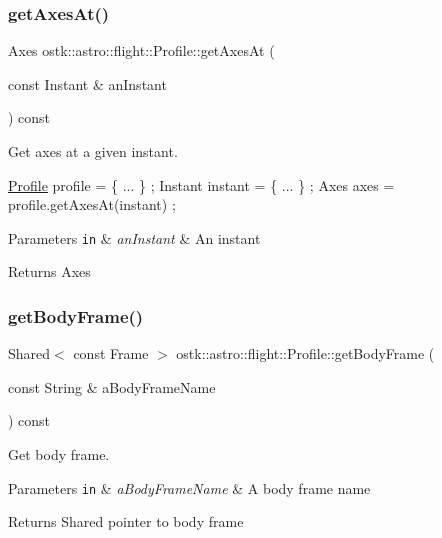 \subsubsection{\texorpdfstring{get\+Axes\+At()}{getAxesAt()}}
{\footnotesize\ttfamily Axes ostk\+::astro\+::flight\+::\+Profile\+::get\+Axes\+At (\begin{DoxyParamCaption}\item[{const Instant \&}]{an\+Instant }\end{DoxyParamCaption}) const}



Get axes at a given instant. 


\begin{DoxyCode}
\hyperlink{classostk_1_1astro_1_1flight_1_1_profile_a80fbc6a3773a6f2790b84c4ddb306d07}{Profile} profile = \{ ... \} ;
Instant instant = \{ ... \} ;
Axes axes = profile.getAxesAt(instant) ;
\end{DoxyCode}



\begin{DoxyParams}[1]{Parameters}
\mbox{\tt in}  & {\em an\+Instant} & An instant \\
\hline
\end{DoxyParams}
\begin{DoxyReturn}{Returns}
Axes 
\end{DoxyReturn}
\mbox{\label{classostk_1_1astro_1_1flight_1_1_profile_a24c6cb3e5d8e567bf3d5030e79300266}} 
\subsubsection{\texorpdfstring{get\+Body\+Frame()}{getBodyFrame()}}
{\footnotesize\ttfamily Shared$<$ const Frame $>$ ostk\+::astro\+::flight\+::\+Profile\+::get\+Body\+Frame (\begin{DoxyParamCaption}\item[{const String \&}]{a\+Body\+Frame\+Name }\end{DoxyParamCaption}) const}



Get body frame. 


\begin{DoxyParams}[1]{Parameters}
\mbox{\tt in}  & {\em a\+Body\+Frame\+Name} & A body frame name \\
\hline
\end{DoxyParams}
\begin{DoxyReturn}{Returns}
Shared pointer to body frame 
\end{DoxyReturn}
\mbox{\label{classostk_1_1astro_1_1flight_1_1_profile_a086758b767464ee2dc06cfda71fa3d48}} 
